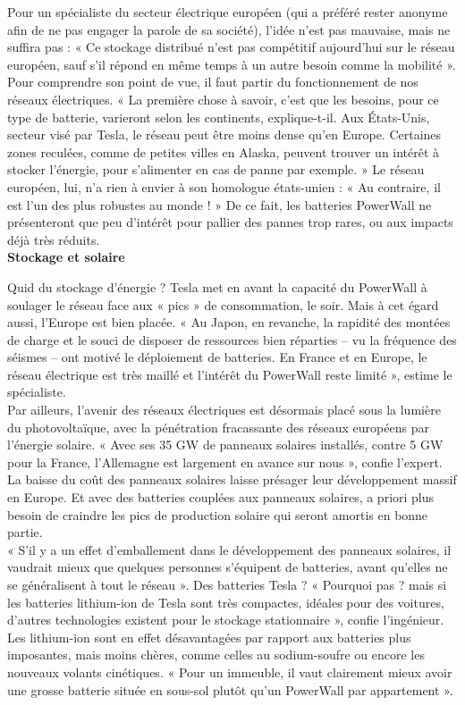 \documentclass[8pt]{article}
\begin{document}
Pour un spécialiste du secteur électrique européen (qui a préféré rester anonyme afin de ne pas engager la parole de sa société), l’idée n’est pas mauvaise, mais ne suffira pas : « Ce stockage distribué n’est pas compétitif aujourd’hui sur le réseau européen, sauf s’il répond en même temps à un autre besoin comme la mobilité ». \\

Pour comprendre son point de vue, il faut partir du fonctionnement de nos réseaux électriques. « La première chose à savoir, c’est que les besoins, pour ce type de batterie, varieront selon les continents, explique-t-il. Aux États-Unis, secteur visé par Tesla, le réseau peut être moins dense qu’en Europe. Certaines zones reculées, comme de petites villes en Alaska, peuvent trouver un intérêt à stocker l’énergie, pour s’alimenter en cas de panne par exemple. » Le réseau européen, lui, n’a rien à envier à son homologue états-unien : « Au contraire, il est l’un des plus robustes au monde ! » De ce fait, les batteries PowerWall ne présenteront que peu d’intérêt pour pallier des pannes trop rares, ou aux impacts déjà très réduits. \\


\textbf{Stockage et solaire}

Quid du stockage d’énergie ? Tesla met en avant la capacité du PowerWall à soulager le réseau face aux « pics » de consommation, le soir. Mais à cet égard aussi, l’Europe est bien placée. « Au Japon, en revanche, la rapidité des montées de charge et le souci de disposer de ressources bien réparties – vu la fréquence des séismes – ont motivé le déploiement de batteries. En France et en Europe, le réseau électrique est très maillé et l’intérêt du PowerWall reste limité », estime le spécialiste. \\

Par ailleurs, l’avenir des réseaux électriques est désormais placé sous la lumière du photovoltaïque, avec la pénétration fracassante des réseaux européens par l’énergie solaire. « Avec ses 35 GW de panneaux solaires installés, contre 5 GW pour la France, l’Allemagne est largement en avance sur nous », confie l'expert. La baisse du coût des panneaux solaires laisse présager leur développement massif en Europe. Et avec des batteries couplées aux panneaux solaires, a priori plus besoin de craindre les pics de production solaire qui seront amortis en bonne partie.  \\

« S’il y a un effet d’emballement dans le développement des panneaux solaires, il vaudrait mieux que quelques personnes s’équipent de batteries, avant qu’elles ne se généralisent à tout le réseau ». Des batteries Tesla ? « Pourquoi pas ? mais si les batteries lithium-ion de Tesla sont très compactes, idéales pour des voitures, d’autres technologies existent pour le stockage stationnaire », confie l’ingénieur. Les lithium-ion sont en effet désavantagées par rapport aux batteries plus imposantes, mais moins chères, comme celles au sodium-soufre ou encore les nouveaux volants cinétiques. « Pour un immeuble, il vaut clairement mieux avoir une grosse batterie située en sous-sol plutôt qu’un PowerWall par appartement ». \\
\end{document}
